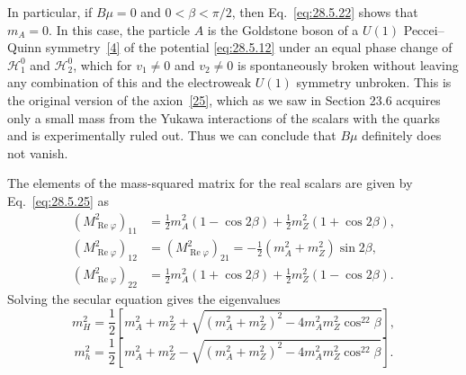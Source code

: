 In particular, if \(B\mu=0\) and \(0<\beta<\pi/2\), then
Eq.~\eqref{eq:28.5.22} shows that \(m_A=0\). In this case, the particle
\(A\) is the Goldstone boson of a \(U(1)\) Peccei--Quinn
symmetry~\hyperref[ch28-ref-4]{[4]} of the potential \eqref{eq:28.5.12}
under an equal phase change of \(\mathcal{H}_1^0\) and
\(\mathcal{H}_2^0\), which for \(v_1\neq0\) and \(v_2\neq0\) is
spontaneously broken without leaving any combination of this and the
electroweak \(U(1)\) symmetry unbroken. This is the original version of the
axion~\hyperref[ch28-ref-25]{[25]}, which as we saw in Section 23.6 acquires
only a small mass from the Yukawa interactions of the scalars with the
quarks and is experimentally ruled out. Thus we can conclude that \(B\mu\)
definitely does not vanish.

The elements of the mass-squared matrix for the real scalars are given by
Eq.~\eqref{eq:28.5.25} as
\begin{equation}
  \begin{aligned}
  (M_{\operatorname{Re}\varphi}^2)_{11}
  &=\frac12m_A^2(1-\cos2\beta)
    +\frac12m_Z^2(1+\cos2\beta),\\
  (M_{\operatorname{Re}\varphi}^2)_{12}
  &=(M_{\operatorname{Re}\varphi}^2)_{21}
    =-\frac12(m_A^2+m_Z^2)\sin2\beta,\\
  (M_{\operatorname{Re}\varphi}^2)_{22}
  &=\frac12m_A^2(1+\cos2\beta)
    +\frac12m_Z^2(1-\cos2\beta).
  \end{aligned}
  \tag{28.5.27}\label{eq:28.5.27}
\end{equation}
Solving the secular equation gives the eigenvalues
\begin{equation}
  m_H^2
  =\frac12\left[
    m_A^2+m_Z^2
    +\sqrt{(m_A^2+m_Z^2)^2-4m_A^2m_Z^2\cos^22\beta}
  \right],
  \tag{28.5.28}\label{eq:28.5.28}
\end{equation}
\begin{equation}
  m_h^2
  =\frac12\left[
    m_A^2+m_Z^2
    -\sqrt{(m_A^2+m_Z^2)^2-4m_A^2m_Z^2\cos^22\beta}
  \right].
  \tag{28.5.29}\label{eq:28.5.29}
\end{equation}

